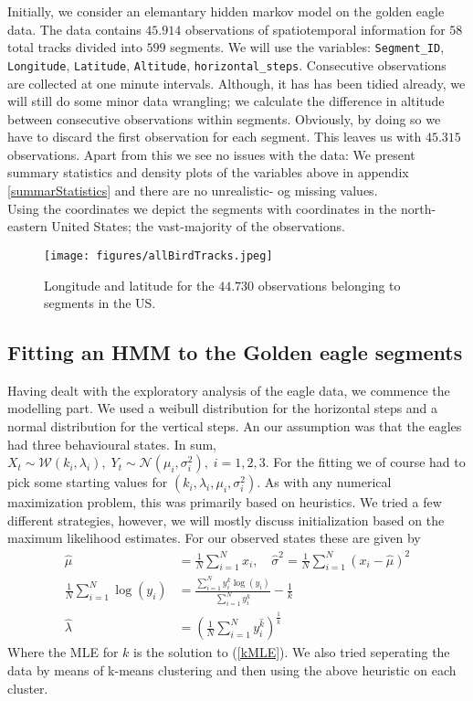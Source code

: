 Initially, we consider an elemantary hidden markov model on the golden eagle data.\cite{eagleData} The data contains $45.914$ observations of spatiotemporal information for $58$ total tracks divided into $599$ segments. We will use the variables: \texttt{Segment\_ID}, \texttt{Longitude}, \texttt{Latitude}, \texttt{Altitude}, \texttt{horizontal\_steps}. Consecutive observations are collected at one minute intervals. Although, it has has been tidied already, we will still do some minor data wrangling; we calculate the difference in altitude between consecutive observations within segments. Obviously, by doing so we have to discard the first observation for each segment. This leaves us with $45.315$ observations. Apart from this we see no issues with the data: We present summary statistics and density plots of the variables above in appendix \ref{summarStatistics} and there are no unrealistic- og missing values.\\ Using the coordinates we depict the segments with coordinates in the north-eastern United States; the vast-majority of the observations.
\begin{figure}[h]
    \begin{center}
        \texttt{[image: figures/allBirdTracks.jpeg]}
        \caption{Longitude and latitude for the $44.730$ observations belonging to segments in the US.}
    \end{center}
\end{figure}
\subsection{Fitting an HMM to the Golden eagle segments}
Having dealt with the exploratory analysis of the eagle data, we commence the modelling part. We used a weibull distribution for the horizontal steps and a normal distribution for the vertical steps. An our assumption was that the eagles had three behavioural states. In sum, $X_t \sim \mathcal{W}(k_i, \lambda_i), \; Y_t \sim \mathcal{N}(\mu_i, \sigma_i^2), \; i = 1,2,3$. For the fitting we of course  had to pick some starting values for $(k_i, \lambda_i, \mu_i, \sigma_i^2)$. As with any numerical maximization problem, this was primarily based on heuristics. We tried a few different strategies, however, we will mostly discuss initialization based on the maximum likelihood estimates. For our observed states these are given by\cite{Cohen1965}
\begin{align}
    \hat{\mu} &= \frac{1}{N}\sum_{i = 1}^N x_i, \quad \hat{\sigma}^2 = \frac{1}{N}\sum_{i = 1}^N \left(x_i-\hat{\mu}\right)^2\\
    \frac{1}{N}\sum_{i = 1}^N \log(y_i)&= \frac{\sum_{i = 1}^N y_i^k\log(y_i)}{\sum_{i = 1}^N y_i^k} - \frac{1}{k} \label{kMLE} \\  \hat{\lambda} &= \left(\frac{1}{N} \sum_{i = 1}^N y_i^{\hat{k}}\right)^{\frac{1}{\hat{k}}}
\end{align}
Where the MLE for $k$ is the solution to (\ref{kMLE}). We also tried seperating the data by means of k-means clustering \cite{RLang} and then using the above heuristic on each cluster.
